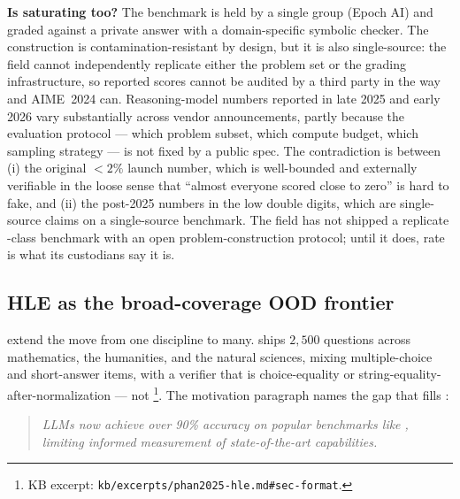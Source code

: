 \begin{contradiction}
\textbf{Is  saturating too?} The benchmark is held by a
single group (Epoch AI) and graded against a private answer  with
a domain-specific symbolic checker. The construction is
contamination-resistant by design, but it is also single-source: the
field cannot independently replicate either the problem set or the
grading infrastructure, so reported  scores cannot be
audited by a third party in the way  and AIME~2024 can.
Reasoning-model  numbers reported in late 2025 and early
2026 vary substantially across vendor announcements, partly because
the evaluation protocol --- which problem subset, which compute
budget, which sampling strategy --- is not fixed by a public spec.
The contradiction is between (i) the original $<\!2\%$ launch
number, which is well-bounded and externally verifiable in the loose
sense that ``almost everyone scored close to zero'' is hard to fake,
and (ii) the post-2025 numbers in the low double digits, which are
single-source claims on a single-source benchmark. The field has not
shipped a replicate -class benchmark with an open
problem-construction protocol; until it does, 
 rate is what its custodians say it is.
\end{contradiction}

\subsection{HLE as the broad-coverage OOD frontier}
\label{sec:reasoning-hle}

\citet{phan2025-hle} extend the  move from one
discipline to many.  ships $2{,}500$ questions
across mathematics, the humanities, and the natural sciences,
mixing multiple-choice and short-answer items, with a verifier that
is choice-equality or string-equality-after-normalization --- not
%
\footnote{KB excerpt: \texttt{kb/excerpts/phan2025-hle.md\#sec-format}.}.
The motivation paragraph names the gap that  fills
\citep[\S{}abstract]{phan2025-hle}:

\begin{quote}\itshape
LLMs now achieve over 90\% accuracy on popular benchmarks like ,
limiting informed measurement of state-of-the-art  capabilities.
\end{quote}

